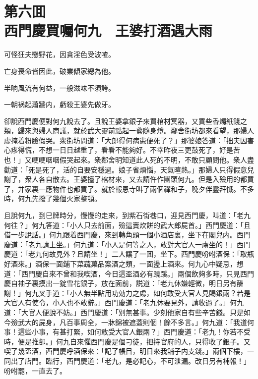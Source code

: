 
\chapter*{第六囬　\\西門慶買囑何九　王婆打酒遇大雨}


\begin{myquote}
可怪狂夫戀野花，因貪淫色受波喳。

亡身喪命皆因此，破業傾家總為他。

半晌風流有何益，一般滋味不須誇。

一朝祸起蕭牆内，虧殺王婆先做牙。
\end{myquote}

卻說西門慶便對何九說去了。且說王婆拿銀子來買棺材冥器，又買些香燭紙錢之類，歸來與婦人商議，就於武大靈前點起一盞隨身燈。鄰舍街坊都來看望，那婦人虚掩着粉臉假哭。衆街坊問道：「大郎得何病患便死了？」那婆娘答道：「拙夫因害心疼得慌，不想一日日越重了，看看不能夠好。不幸昨夜三更鼓死了，好是苦也！」又哽哽咽咽假哭起來。衆鄰舍明知道此人死的不明，不敢只顧問他。衆人盡勸道：「死是死了，活的自要安穩過。娘子省煩惱，天氣暄熱。」那婦人只得假意兒謝了，衆人各自散去。王婆擡了棺材來，又去請仵作團頭何九。但是入殮用的都買了，并家裏一應物件也都買了。就於報恩寺叫了兩個禪和子，晚夕伴靈拜懺。不多時，何九先撥了幾個火家整頓。

且說何九，到巳牌時分，慢慢的走來，到紫石街巷口，迎見西門慶，叫道：「老九何往？」何九答道：「小人只去前面，殮這賣炊餅的武大郎屍首。」西門慶道：「且借一步說話。」何九跟着西門慶，來到轉角頭一個小酒店裏，坐下在閣兒内。西門慶道：「老九請上坐。」何九道：「小人是何等之人，敢對大官人一䖏坐的！」西門慶道：「老九何故見外？且請坐！」二人讓了一囬，坐下。西門慶吩咐酒保：「取瓶好酒來。」酒保一面鋪下菜蔬菓品案酒之類，一面盪上酒來。何九心中疑忌，想道：「西門慶自來不曾和我喫酒，今日這盃酒必有蹺蹊。」兩個飲夠多時，只見西門慶自袖子裏摸出一錠雪花銀子，放在面前，説道：「老九休嫌輕微，明日另有酬謝！」何九叉手道：「小人無半點用功効力之䖏，如何敢受大官人見賜銀兩？若是大官人有使令，小人也不敢辭。」西門慶道：「老九休要見外，請收過了。」何九道：「大官人便說不妨。」西門慶道：「别無甚事。少刻他家自有些辛苦錢。只是如今殮武大的屍身，凡百事周全，一牀錦被遮蓋則個！餘不多言。」何九道：「我道何事！這些小事，有甚打緊，如何敢受大官人銀兩？」西門慶道：「老九！你若不受時，便是推卻。」何九自來懼西門慶是個刁徒，把持官府的人，只得收了銀子。又喫了幾盃酒，西門慶呼酒保來：「記了帳目，明日來我舖子内支錢。」兩個下樓，一同出了店門。臨行，西門慶道：「老九，是必記心，不可泄漏。改日另有補報！」吩咐罷，一直去了。

